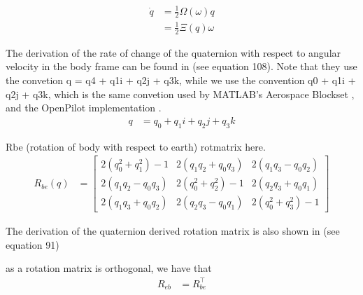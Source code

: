 \documentclass[]{article}
\begin{document}
{\begin{align}
	\dot{q} 	&= \frac{1}{2} \Omega(\omega) q \\
				&= \frac{1}{2} \Xi(q) \omega
\end{align}

The derivation of the rate of change of the quaternion with respect to angular velocity in the body frame can be found in \cite{MARSlab} (see equation 108). Note that they use the convetion q = q4 + q1i + q2j + q3k, while we use the convention q0 + q1i + q2j + q3k, which is the same convetion used by MATLAB's Aerospace Blockset \cite{MATLABAerospace}, and the OpenPilot implementation \cite{OpenPilotPaper}.
\begin{align}
	q &= q_0 + q_1i + q_2j + q_3k
\end{align}

Rbe (rotation of body with respect to earth)
rotmatrix here.
\begin{align}
	R_{be}(q) &=
	\left[
	\begin{matrix}
		2(q_0^2 + q_1^2) - 1 	& 2(q_1 q_2 + q_0 q_3) 	& 2(q_1 q_3 - q_0 q_2) \\
		2(q_1 q_2 - q_0 q_3) 	& 2(q_0^2 + q_2^2) - 1 	& 2(q_2 q_3 + q_0 q_1) \\
		2(q_1 q_3 + q_0 q_2)	& 2(q_2 q_3 - q_0 q_1)	& 2(q_0^2 + q_3^2) - 1
	\end{matrix}
	\right]
\end{align}

The derivation of the quaternion derived rotation matrix is also shown in \cite{MARSlab} (see equation 91)

as a rotation matrix is orthogonal, we have that
\begin{align}
	R_{eb} &= R_{be}^\top
\end{align}

}
\end{document}
